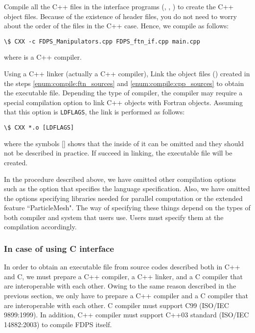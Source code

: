 \begin{enumerate}[leftmargin=*,label={[\arabic*]}]
 Compile all the C++ files in the interface programs (, , ) to create the C++ object files. Because of the existence of header files, you do not need to worry about the order of the files in the C++ case. Hence, we compile as follows:
\begin{Verbatim}[commandchars=\\\{\}]
\$ CXX -c FDPS_Manipulators.cpp FDPS_ftn_if.cpp main.cpp
\end{Verbatim}
where  is a C++ compiler.
\label{enum:compile:cpp_sources}

 Using a C++ linker (actually a C++ compiler), Link the object files () created in the steps \ref{enum:compile:ftn_sources} and \ref{enum:compile:cpp_sources} to obtain the executable file. Depending the type of compiler, the compiler may require a special compilation option to link C++ objects with Fortran objects. Assuming that this option is \verb|LDFLAGS|, the link is performed as follows:
\begin{Verbatim}[commandchars=\\\{\}]
\$ CXX *.o [LDFLAGS]
\end{Verbatim}
where the symbols [] shows that the inside of it can be omitted and they should not be described in practice. If succeed in linking, the executable file will be created.
\end{enumerate}

In the procedure described above, we have omitted other compilation options such as the option that specifies the language specification. Also, we have omitted the options specifying libraries needed for parallel computation or the extended feature ``ParticleMesh". The way of specifying these things depend on the types of both compiler and system that users use. Users must specify them at the compilation accordingly.

\subsubsection{In case of using C interface}
In order to obtain an executable file from source codes described both in C++ and C, we must prepare a C++ compiler, a C++ linker, and a C compiler that are interoperable with each other. Owing to the same reason described in the previous section, we only have to prepare a C++ compiler and a C compiler that are interoperable with each other. C compiler must support C99 (ISO/IEC 9899:1999). In addition, C++ compiler must support C++03 standard (ISO/IEC 14882:2003) to compile FDPS itself.

